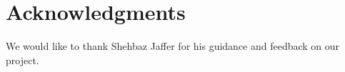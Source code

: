 \section*{Acknowledgments}
We would like to thank Shehbaz Jaffer for his guidance and feedback on our
project.
